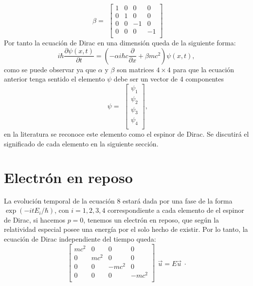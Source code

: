 \documentclass[twocolumn]{article}
\begin{document}
\begin{equation}
\begin{matrix}
\beta=
\end{matrix}
\begin{bmatrix}
1 & 0 & 0 & 0 \\
0 & 1 & 0 & 0 \\
0 & 0 & -1 & 0 \\
0 & 0 & 0 & -1 \\
\end{bmatrix}
\end{equation}
Por tanto la ecuación de Dirac en una dimensión queda de la siguiente forma:
%
\begin{equation}
    i\hbar \frac{\partial \psi(x,t)}{\partial t}=\left(-\alpha i\hbar c\frac{\partial}{\partial x} + \beta mc^2\right)\psi(x,t) ,
\end{equation}
como se puede observar ya que $\alpha$ y $\beta$ son matrices $4\times 4$ para que la ecuación anterior tenga sentido el elemento $\psi$ debe ser un vector de 4 componentes 
\begin{equation}
\begin{matrix}
\psi=
\end{matrix}
\begin{bmatrix}
\psi_1 \\
\psi_2 \\
\psi_3 \\
\psi_4 \\
\end{bmatrix}
,
\end{equation}
en la literatura se reconoce este elemento como el espinor de Dirac. Se discutirá el significado de cada elemento en la siguiente sección.

\section{Electrón en reposo}
La evolución temporal de la ecuación $8$ estará dada por una fase de la forma $\exp( {-itE_i}/{\hbar})$, con $i=1,2,3,4$ correspondiente a cada elemento de el espinor de Dirac, si hacemos $p=0$, tenemos un electrón en reposo, que según la relatividad especial posee una energía por el solo hecho de existir. Por lo tanto, la ecuación de Dirac independiente del tiempo queda:
\begin{equation}
\begin{bmatrix}
mc^2 & 0 & 0 & 0 \\
0 & mc^2 & 0 & 0 \\
0 & 0 & -mc^2 & 0 \\
0 & 0 & 0 & -mc^2 \\
\end{bmatrix}
\begin{matrix}
\Vec{u}=E\Vec{u}
\end{matrix}
.
\end{equation}
\end{document}
